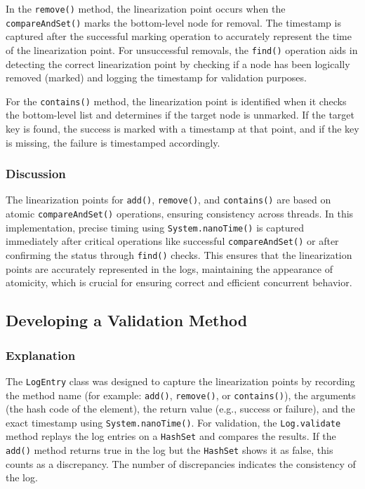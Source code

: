 \documentclass{article}
\begin{document}
In the \texttt{remove()} method, the linearization point occurs when the \texttt{compareAndSet()} marks the bottom-level node for removal. The timestamp is captured after the successful marking operation to accurately represent the time of the linearization point. For unsuccessful removals, the \texttt{find()} operation aids in detecting the correct linearization point by checking if a node has been logically removed (marked) and logging the timestamp for validation purposes.

For the \texttt{contains()} method, the linearization point is identified when it checks the bottom-level list and determines if the target node is unmarked. If the target key is found, the success is marked with a timestamp at that point, and if the key is missing, the failure is timestamped accordingly.

\subsubsection{Discussion}
The linearization points for \texttt{add()}, \texttt{remove()}, and \texttt{contains()} are based on atomic \texttt{compareAndSet()} operations, ensuring consistency across threads. In this implementation, precise timing using \texttt{System.nanoTime()} is captured immediately after critical operations like successful \texttt{compareAndSet()} or after confirming the status through \texttt{find()} checks. This ensures that the linearization points are accurately represented in the logs, maintaining the appearance of atomicity, which is crucial for ensuring correct and efficient concurrent behavior.




\newpage
\subsection{Developing a Validation Method}

\subsubsection{Explanation}
The \texttt{LogEntry} class was designed to capture the linearization points by recording the method name (for example: \texttt{add()}, \texttt{remove()}, or \texttt{contains()}), the arguments (the hash code of the element), the return value (e.g., success or failure), and the exact timestamp using \texttt{System.nanoTime()}. For validation, the \texttt{Log.validate} method replays the log entries on a \texttt{HashSet} and compares the results. If the \texttt{add()} method returns true in the log but the \texttt{HashSet} shows it as false, this counts as a discrepancy. The number of discrepancies indicates the consistency of the log.
\end{document}

